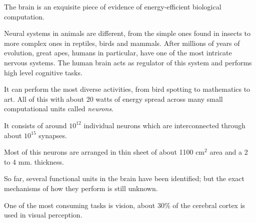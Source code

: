The brain is an exquisite piece of evidence of energy-efficient biological computation.

Neural systems in animals are different, from the simple ones found in insects to more complex ones in reptiles, birds and mammals. After millions of years of evolution, great apes, humans in particular,  have one of the most intricate nervous systems. The human brain acts as regulator of this system and performs high level cognitive tasks.

It can perform the most diverse activities, from bird spotting to mathematics to art. All of this with about 20 watts of energy spread across many small computational units called \emph{neurons}.

It consists of around $10^{12}$ individual neurons which are interconnected through about $10^{15}$ synapses.

Most of this neurons are arranged in thin sheet of about 1100 cm$^2$ area and a 2 to 4 mm. thickness.

So far, several functional units in the brain have been identified; but the exact mechanisms of how they perform is still unknown.


One of the most consuming tasks is vision, about 30\% of the cerebral cortex is used in visual perception. 

